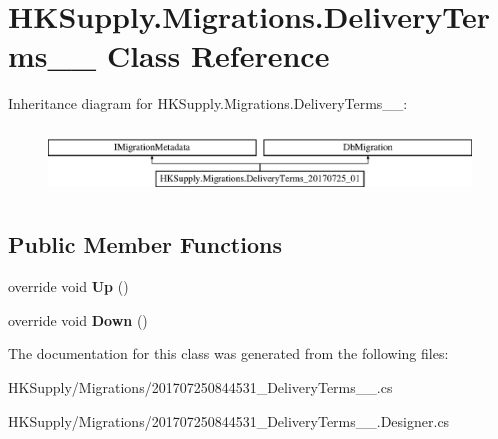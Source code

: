 \hypertarget{class_h_k_supply_1_1_migrations_1_1_delivery_terms__20170725__01}{}\section{H\+K\+Supply.\+Migrations.\+Delivery\+Terms\+\_\+\_ Class Reference}
\label{class_h_k_supply_1_1_migrations_1_1_delivery_terms__20170725__01}
Inheritance diagram for H\+K\+Supply.\+Migrations.\+Delivery\+Terms\+\_\+\_\+:\begin{figure}[H]
\begin{center}
\leavevmode
\includegraphics[height=1.812298cm]{class_h_k_supply_1_1_migrations_1_1_delivery_terms__20170725__01}
\end{center}
\end{figure}
\subsection*{Public Member Functions}
\begin{DoxyCompactItemize}
\item 
\mbox{\label{class_h_k_supply_1_1_migrations_1_1_delivery_terms__20170725__01_a679828bc1de3a238068c12dac13616af}} 
override void {\bfseries Up} ()
\item 
\mbox{\label{class_h_k_supply_1_1_migrations_1_1_delivery_terms__20170725__01_a7074e63da435c02822aeed115be21fbb}} 
override void {\bfseries Down} ()
\end{DoxyCompactItemize}


The documentation for this class was generated from the following files\+:\begin{DoxyCompactItemize}
\item 
H\+K\+Supply/\+Migrations/201707250844531\+\_\+\+Delivery\+Terms\+\_\+\_.\+cs\item 
H\+K\+Supply/\+Migrations/201707250844531\+\_\+\+Delivery\+Terms\+\_\+\_.\+Designer.\+cs\end{DoxyCompactItemize}
